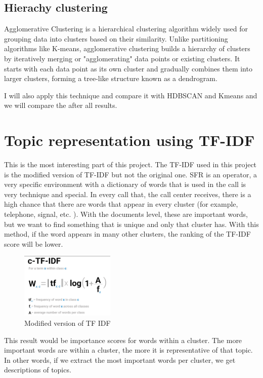 \subsection{Hierachy clustering}

Agglomerative Clustering is a hierarchical clustering algorithm widely used for grouping data into clusters based on their similarity. Unlike partitioning algorithms like K-means, agglomerative clustering builds a hierarchy of clusters by iteratively merging or "agglomerating" data points or existing clusters. It starts with each data point as its own cluster and gradually combines them into larger clusters, forming a tree-like structure known as a dendrogram.

I will also apply this technique and compare it with HDBSCAN and Kmeans and we will compare the after all results.

\section{Topic representation using TF-IDF}

This is the most interesting part of this project. The TF-IDF used in this project is the modified version of TF-IDF but not the original one. SFR is an operator, a very specific environment with a dictionary of words that is used in the call is very technique and special. In every call that, the call center receives, there is a high chance that there are words that appear in every cluster (for example, telephone, signal, etc. ). With the documents level, these are important words, but we want to find something that is unique and only that cluster has. With this method, if the word appears in many other clusters, the ranking of the TF-IDF score will be lower.

\begin{figure}[H]
    \centering
    \includegraphics[width=0.4\textwidth]{images/tfidf.png}
    \caption{Modified version of TF IDF}
    \label{fig:tf-idf}
\end{figure}

This result would be importance scores for words within a cluster. The more important words are within a cluster, the more it is representative of that topic. In other words, if we extract the most important words per cluster, we get descriptions of topics.

